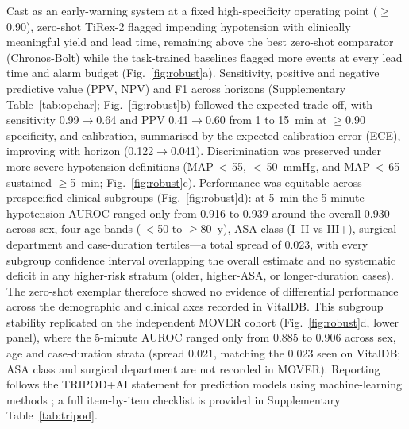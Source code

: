 \documentclass[11pt]{article}
\begin{document}
Cast as an early-warning system at a fixed high-specificity operating point
($\geq$0.90), zero-shot TiRex-2 flagged impending hypotension with
clinically meaningful yield and lead time, remaining above the best
zero-shot comparator (Chronos-Bolt) while the task-trained baselines flagged more
events at every lead time and alarm budget (Fig.~\ref{fig:robust}a).
Sensitivity, positive and negative predictive value (PPV, NPV) and F1 across horizons (Supplementary Table~\ref{tab:opchar};
Fig.~\ref{fig:robust}b) followed the expected trade-off, with sensitivity
0.99$\rightarrow$0.64 and PPV 0.41$\rightarrow$0.60 from 1 to 15~min at
$\geq$0.90 specificity, and calibration, summarised by the expected calibration error (ECE), improving with horizon (0.122$\rightarrow$0.041). Discrimination was preserved under more severe
hypotension definitions (MAP\,$<$\,55, $<$\,50~mmHg, and MAP\,$<$\,65
sustained $\geq$5~min; Fig.~\ref{fig:robust}c). Performance was
equitable across prespecified clinical subgroups
(Fig.~\ref{fig:robust}d): at 5~min the 5-minute hypotension AUROC ranged
only from 0.916 to 0.939 around the overall 0.930 across sex, four age
bands (\,$<$50 to $\geq$80~y), ASA class (I--II vs III+), surgical
department and case-duration tertiles---a total spread of 0.023, with
every subgroup confidence interval overlapping the overall estimate and
no systematic deficit in any higher-risk stratum (older, higher-ASA, or
longer-duration cases). The zero-shot exemplar therefore
showed no evidence of differential performance across the demographic and
clinical axes recorded in VitalDB. This subgroup stability replicated on the
independent MOVER cohort (Fig.~\ref{fig:robust}d, lower panel), where the
5-minute AUROC ranged only from 0.885 to 0.906 across sex, age and
case-duration strata (spread 0.021, matching the 0.023 seen on VitalDB; ASA
class and surgical department are not recorded in MOVER). Reporting follows
the TRIPOD+AI
statement for prediction models using machine-learning methods
\citep{Collins2024}; a full item-by-item checklist is provided in
Supplementary Table~\ref{tab:tripod}.
\end{document}
